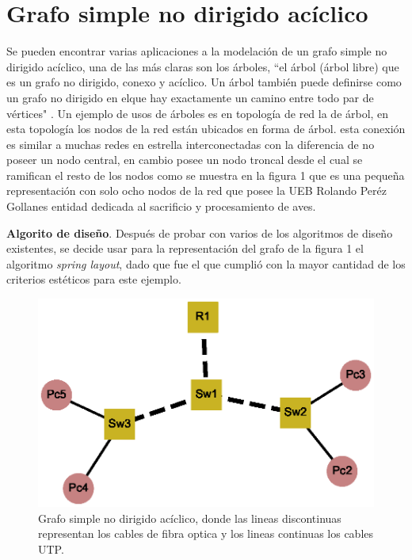 \documentclass{article}
\begin{document}
\section{ Grafo simple no dirigido acíclico}
Se pueden encontrar varias aplicaciones a la modelación de un grafo simple no dirigido acíclico, una de las más claras son los árboles, “el árbol (árbol libre) que es un grafo no dirigido, conexo y acíclico. Un árbol también puede definirse como un grafo no dirigido en elque hay exactamente un camino entre todo par de vértices" \cite{gf1}. \linebreak
Un ejemplo de usos de árboles es en topología de red la de árbol, en esta topología los nodos de la red están ubicados en forma de árbol. esta conexión es similar a muchas redes en estrella interconectadas con la diferencia de no poseer un nodo central, en cambio posee un nodo troncal desde el cual se ramifican el resto de los nodos como se muestra en la figura 1 que es una pequeña representación con solo ocho nodos de la red que posee la UEB Rolando Peréz Gollanes entidad dedicada al sacrificio y procesamiento de aves.\linebreak 

\textbf{Algorito de diseño}.\linebreak
Después de probar con varios de los algoritmos de diseño existentes, se decide usar para la representación del grafo de la figura 1 el algoritmo \textit{spring layout}, dado que fue el que cumplió con la mayor cantidad de los criterios estéticos para este ejemplo.

 
 
\begin{center}

\end{center}
\begin{figure}[ht]
\begin{center}
\includegraphics[scale=0.7]{Graf1_spring_layout.eps}
\caption{Grafo simple no dirigido acíclico, donde las lineas discontinuas representan los cables de fibra optica y los lineas continuas los cables UTP.}
\end{center}
\end{figure}
\end{document}
